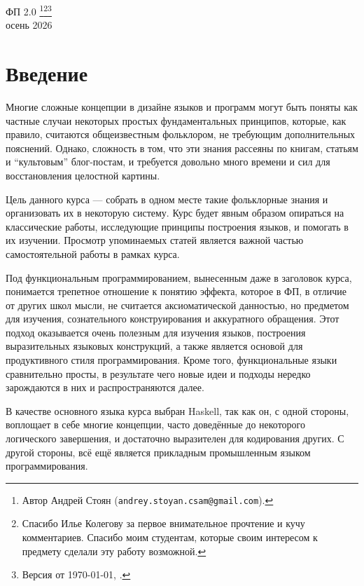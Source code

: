 \documentclass[12pt]{article}
\begin{document}
    \begin{center}
    {\LARGE ФП 2.0}
        \footnote{Автор Андрей Стоян (\texttt{andrey.stoyan.csam@gmail.com}).}\footnote{Спасибо Илье Колегову за первое внимательное прочтение и кучу комментариев. Спасибо моим студентам, которые своим интересом к предмету сделали эту работу возможной.}\footnote{Версия от \today, \currenttime.}
        \\
        осень 2026
    \end{center}

    \tableofcontents

    \newpage

    \section*{Введение}

    Многие сложные концепции в дизайне языков и программ могут быть поняты как частные случаи некоторых простых фундаментальных принципов, которые, как правило, считаются общеизвестным фольклором, не требующим дополнительных пояснений.
    Однако, сложность в том, что эти знания рассеяны по книгам, статьям и ``культовым'' блог-постам, и требуется довольно много времени и сил для восстановления целостной картины.

    Цель данного курса --- собрать в одном месте такие фольклорные знания и организовать их в некоторую систему.
    Курс будет явным образом опираться на классические работы, исследующие принципы построения языков, и помогать в их изучении.
    Просмотр упоминаемых статей является важной частью самостоятельной работы в рамках курса.

    Под функциональным программированием, вынесенным даже в заголовок курса, понимается трепетное отношение к понятию эффекта, которое в ФП, в отличие от других школ мысли, не считается аксиоматической данностью, но предметом для изучения, сознательного конструирования и аккуратного обращения.
    Этот подход оказывается очень полезным для изучения языков, построения выразительных языковых конструкций, а также является основой для продуктивного стиля программирования.
    Кроме того, функциональные языки сравнительно просты, в результате чего новые идеи и подходы нередко зарождаются в них и распространяются далее.

    В качестве основного языка курса выбран Haskell, так как он, с одной стороны, воплощает в себе многие концепции, часто доведённые до некоторого логического завершения, и достаточно выразителен для кодирования других.
    С другой стороны, всё ещё является прикладным промышленным языком программирования.
\end{document}
